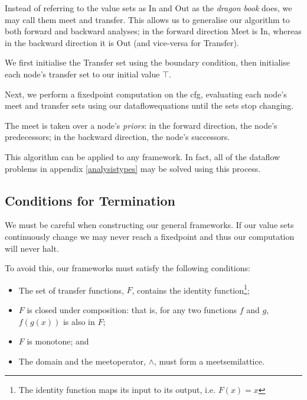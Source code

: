 \documentclass[bsc,twoside,singlespacing,parskip,logo,notimes,normalheadings]{infthesis}
\begin{document}
          Instead of referring to the value sets as In and Out as the
          {\em dragon book} does, we may call them \Gls{meet} and
          \Gls{transfer}. This allows us to generalise our algorithm
          to both forward and backward analyses; in the forward
          direction Meet is In, whereas in the backward direction it
          is Out (and vice-versa for Transfer).

          We first initialise the Transfer set using the boundary
          condition, then initialise each node's transfer set to our
          initial value $\top$.

          Next, we perform a \gls{fixedpoint} computation on the
          \gls{cfg}, evaluating each node's \Gls{meet} and
          \Gls{transfer} sets using our \gls{dataflowequations} until
          the sets stop changing.

          The \gls{meet} is taken over a node's {\em priors}: in the
          forward direction, the node's predecessors; in the backward
          direction, the node's successors.

          This algorithm can be applied to any framework. In fact, all
          of the \gls{dataflow} problems in appendix
          \ref{analysistypes} may be solved using this process.

          \subsection{Conditions for Termination}
          
          We must be careful when constructing our general
          frameworks. If our value sets continuously change we may
          never reach a \gls{fixedpoint} and thus our computation will
          never halt.

          To avoid this, our frameworks must satisfy the following
          conditions\cite[p. 684]{dragonbook}:

          \begin{itemize}
          \item The set of \gls{transfer} functions, $F$, contains
            the identity function\footnote{The identity function maps
              its input to its output, i.e. $F(x)=x$};
          \item $F$ is closed under composition: that is, for any two
            functions $f$ and $g$, $f(g(x))$ is also in $F$;
          \item $F$ is monotone; and
          \item The \gls{domain} and the \gls{meetoperator}, $\land$, must
            form a \gls{meetsemilattice}.
          \end{itemize}
\end{document}
